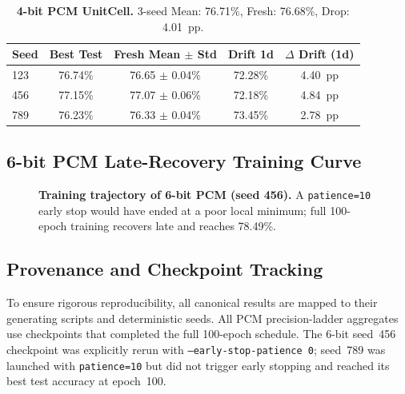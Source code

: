 \begin{table}[htbp]
\centering
\caption{\textbf{4-bit PCM UnitCell.} 3-seed Mean: 76.71\%, Fresh: 76.68\%, Drop: 4.01~pp.}
\label{tab:supp_4bit_pcm}
\begin{tabular}{lcccc}
\toprule
\textbf{Seed} & \textbf{Best Test} & \textbf{Fresh Mean $\pm$ Std} & \textbf{Drift 1d} & \textbf{$\Delta$ Drift (1d)} \\
\midrule
123 & 76.74\% & 76.65 $\pm$ 0.04\% & 72.28\% & 4.40~pp \\
456 & 77.15\% & 77.07 $\pm$ 0.06\% & 72.18\% & 4.84~pp \\
789 & 76.23\% & 76.33 $\pm$ 0.04\% & 73.45\% & 2.78~pp \\
\bottomrule
\end{tabular}
\end{table}

\subsection{6-bit PCM Late-Recovery Training Curve}
\label{subsec:supp-late-recovery}

\begin{figure}[htbp]
    \centering
    
    \caption{\textbf{Training trajectory of 6-bit PCM (seed 456).} A \texttt{patience=10} early stop would have ended at a poor local minimum; full 100-epoch training recovers late and reaches 78.49\%.}
    \label{fig:supp_late_recovery}
\end{figure}

\subsection{Provenance and Checkpoint Tracking}
\label{subsec:supp-provenance}

To ensure rigorous reproducibility, all canonical results are mapped to their generating scripts and deterministic seeds. All PCM precision-ladder aggregates use checkpoints that completed the full 100-epoch schedule. The 6-bit seed~456 checkpoint was explicitly rerun with \texttt{--early-stop-patience 0}; seed~789 was launched with \texttt{patience=10} but did not trigger early stopping and reached its best test accuracy at epoch~100.

